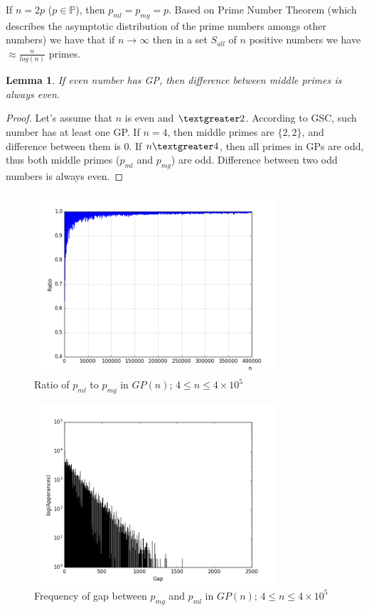 \documentclass[10pt,twocolumn]{article}
\newtheorem{lemma}[theorem]{Lemma}
\begin{document}
If $n = 2p$ ($p \in \mathbb{P}$), then $p_{ml} = p_{mg} = p$. Based on Prime Number Theorem (which describes the asymptotic distribution of the prime numbers amongs other numbers) we have that if $n \to \infty$ then in a set $S_{all}$ of $n$ positive numbers we have $\approx \frac{n}{log (n)}$ primes.

\begin{lemma}
If even number has GP, then difference between middle primes is always even.
\end{lemma}
\begin{proof}
Let's assume that $n$ is even and $\textgreater 2$. According to GSC, such number has at least one GP. If $n=4$, then middle primes are $\{2, 2\}$, and difference between them is $0$. If $n \textgreater 4$, then all primes in GPs are odd, thus both middle primes ($p_{ml}$ and $p_{mg}$) are odd. Difference between two odd numbers is always even.
\end{proof}

\begin{figure}[!ht]
\centering
\captionsetup{justification=centering}
\includegraphics[width=9cm]{f_ratio_two_biggest_primes}
\caption[caption]{Ratio of $p_{ml}$ to $p_{mg}$ in $GP(n)$; $4 \leq n \leq 4 \times 10^5$}
\label{fig:middleprimesratio}
\end{figure}

\begin{figure}[!ht]
\centering
\captionsetup{justification=centering}
\includegraphics[width=9cm]{f_diff_in_middle_primes_freq}
\caption[caption]{Frequency of gap between $p_{mg}$ and $p_{ml}$ in $GP(n)$; $4 \leq n \leq 4 \times 10^5$}
\label{fig:middleprimesgapfreq}
\end{figure}
\end{document}
